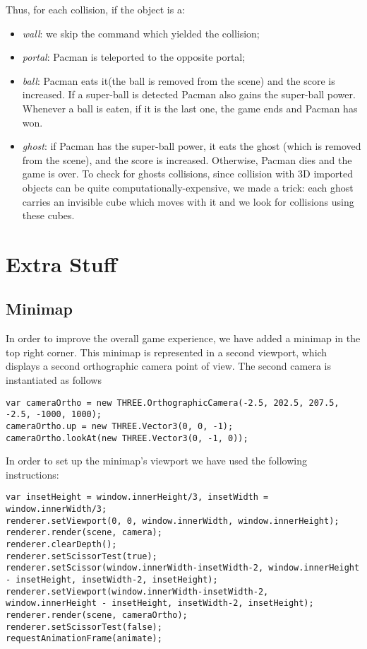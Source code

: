 \documentclass[a4paper,oneside]{report}
\begin{document}
Thus, for each collision, if the object is a:
\begin{itemize}
\item \textit{wall}: we skip the command which yielded the collision;
\item \textit{portal}: Pacman is teleported to the opposite portal;
\item \textit{ball}: Pacman eats it(the ball is removed from the scene) and the score is increased. If a super-ball is detected Pacman also gains the super-ball power. Whenever a ball is eaten, if it is the last one, the game ends and Pacman has won.
\item \textit{ghost}: if Pacman has the super-ball power, it eats the ghost (which is removed from the scene), and the score is increased. Otherwise, Pacman dies and the game is over. To check for ghosts collisions, since collision with 3D imported objects can be quite computationally-expensive, we made a trick: each ghost carries an invisible cube which moves with it and we look for collisions using these cubes.
\end{itemize}

\chapter{Extra Stuff}

\section{Minimap}
In order to improve the overall game experience, we have added a minimap in the top right corner. This minimap is represented in a second viewport, which displays a second orthographic camera point of view. The second camera is instantiated as follows
\begin{lstlisting}
var cameraOrtho = new THREE.OrthographicCamera(-2.5, 202.5, 207.5, -2.5, -1000, 1000);
cameraOrtho.up = new THREE.Vector3(0, 0, -1);
cameraOrtho.lookAt(new THREE.Vector3(0, -1, 0));
\end{lstlisting}
In order to set up the minimap's viewport we have used the following instructions:
\begin{lstlisting}
var insetHeight = window.innerHeight/3, insetWidth = window.innerWidth/3;
renderer.setViewport(0, 0, window.innerWidth, window.innerHeight);
renderer.render(scene, camera);
renderer.clearDepth();
renderer.setScissorTest(true);
renderer.setScissor(window.innerWidth-insetWidth-2, window.innerHeight - insetHeight, insetWidth-2, insetHeight);
renderer.setViewport(window.innerWidth-insetWidth-2, window.innerHeight - insetHeight, insetWidth-2, insetHeight);
renderer.render(scene, cameraOrtho);
renderer.setScissorTest(false);
requestAnimationFrame(animate);
\end{lstlisting}
\end{document}
